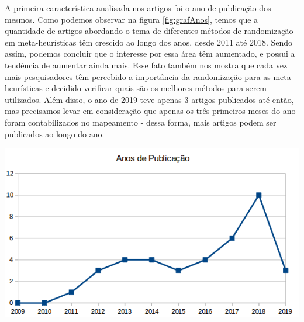 A primeira característica analisada nos artigos foi o ano de publicação dos mesmos. Como podemos observar na figura \ref{fig:grafAnos}, temos que a quantidade de artigos abordando o tema de diferentes métodos de randomização em meta-heurísticas têm crescido ao longo dos anos, desde 2011 até 2018. Sendo assim, podemos concluir que o interesse por essa área têm aumentado, e possui a tendência de aumentar ainda mais. Esse fato também nos mostra que cada vez mais pesquisadores têm percebido a importância da randomização para as meta-heurísticas e decidido verificar quais são os melhores métodos para serem utilizados. Além disso, o ano de 2019 teve apenas 3 artigos publicados até então, mas precisamos levar em consideração que apenas os três primeiros meses do ano foram contabilizados no mapeamento - dessa forma, mais artigos podem ser publicados ao longo do ano.

{
    \centering
    \includegraphics[width=0.7\linewidth]{figuras/graficoAnos.png}
    \label{fig:grafAnos}
}

